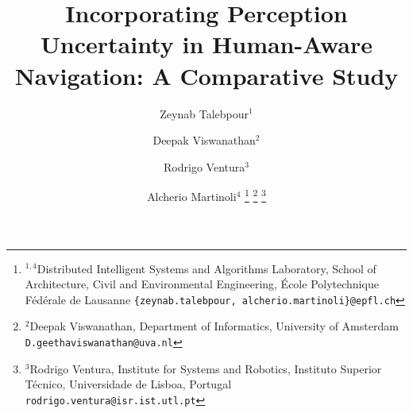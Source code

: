 \documentclass[letterpaper, 10 pt, conference]{ieeeconf}  %
\title{Incorporating Perception Uncertainty in Human-Aware Navigation: A Comparative Study}
\author{Zeynab Talebpour$^{1}$ \and Deepak Viswanathan$^{2}$ \and Rodrigo Ventura$^{3}$ \and Alcherio Martinoli$^{4}$%
\thanks{$^{1,4}$Distributed Intelligent Systems and Algorithms Laboratory,
School of Architecture, Civil and Environmental Engineering,
 \'Ecole Polytechnique F\'ed\'erale de Lausanne 
        {\tt\small \{zeynab.talebpour, alcherio.martinoli\}@epfl.ch}}%
\thanks{$^{2}$Deepak Viswanathan, Department of Informatics, University of Amsterdam
        {\tt\small D.geethaviswanathan@uva.nl}}%
\thanks{$^{3}$Rodrigo Ventura, Institute for Systems and Robotics, Instituto Superior T\'ecnico, Universidade de Lisboa, Portugal
        {\tt\small  rodrigo.ventura@isr.ist.utl.pt}}%
}
\begin{document}
\maketitle
\thispagestyle{empty}
\pagestyle{empty}


\begin{abstract}


\end{abstract}









%











\end{document}
